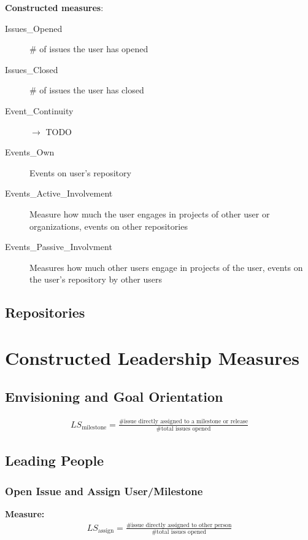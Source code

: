 \documentclass[a4paper,10pt]{article}
\begin{document}
\textbf{Constructed measures}:
\begin{description}
 \item [Issues\_Opened] \# of issues the user has opened
 \item [Issues\_Closed] \# of issues the user has closed
\item [Event\_Continuity] $\to$ TODO
\item [Events\_Own] Events on user's repository
\item [Events\_Active\_Involvement] Measure how much the user engages in projects of other user or organizations, events on other repositories 
\item [Events\_Passive\_Involvment] Measures how much other users engage in projects of the user, events on the user's repository by other users
\end{description}



\subsection{Repositories}



\section{Constructed Leadership Measures}
\subsection{Envisioning and Goal Orientation}

\begin{align}
 LS_{\text{milestone}} = \frac{\text{\# issue directly assigned to a milestone or release}}{\text{\# total issues opened}} 
\end{align}




\subsection{Leading People}
\subsubsection{Open Issue and Assign  User/Milestone}

\textbf{Measure:}
\begin{align}
 LS_{\text{assign}} = \frac{\text{\# issue directly assigned to other person}}{\text{\# total issues opened}} 
\end{align}
\end{document}
